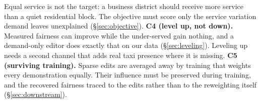 Equal service is not the target: a
business district should receive more service than a quiet residential block.
The objective must score only the service variation demand leaves
unexplained (\S\ref{sec:objective}).
\textbf{C4 (level up, not down).} Measured fairness can improve while the
under-served gain nothing, and a demand-only editor does exactly that on our
data (\S\ref{sec:leveling}). Leveling up needs a second channel that adds real
taxi presence where it is missing.
\textbf{C5 (surviving training).} Sparse edits are averaged away by training
that weights every demonstration equally. Their influence must be preserved
during training, and the recovered fairness traced to the edits rather than to
the reweighting itself (\S\ref{sec:downstream}).
